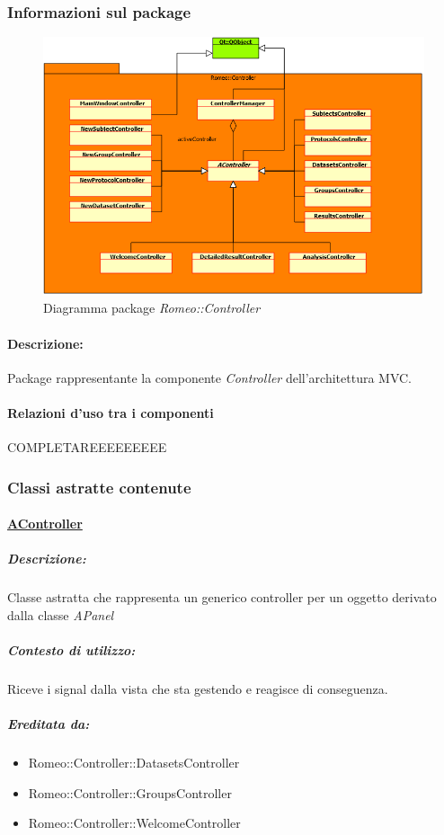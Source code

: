 		\subsubsection{Informazioni sul package}
			\begin{figure}[!h]
				\centering
				\includegraphics[scale=0.5]{./Content/Immagini/Romeo__Controller.png}
				\caption{Diagramma package \textsl{Romeo::Controller}}
			\end{figure}
			\paragraph{Descrizione:}Package\g{} rappresentante la componente \textsl{Controller} dell'architettura MVC\g{}.
			\paragraph{Relazioni d'uso tra i componenti}
COMPLETAREEEEEEEEE		\subsubsection{Classi astratte contenute}
			\paragraph{\underline{AController}}
				\subparagraph{Descrizione:}Classe astratta che rappresenta un generico controller per un oggetto derivato dalla classe \textsl{APanel}
				\subparagraph{Contesto di utilizzo:}Riceve i signal\g{} dalla vista che sta gestendo e reagisce di conseguenza.
				\subparagraph{Ereditata da:}
					\begin{itemize}
						\item Romeo::Controller::DatasetsController
						\item Romeo::Controller::GroupsController
						\item Romeo::Controller::WelcomeController
					\end{itemize}
